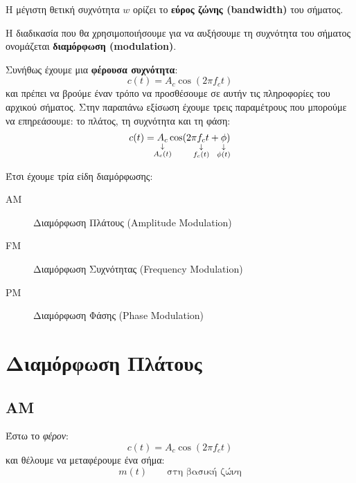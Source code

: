 \documentclass[11pt,a4paper,notitlepage,fleqn]{article}
\begin{document}

Η μέγιστη θετική συχνότητα \( w \) ορίζει το \textbf{εύρος ζώνης (bandwidth)} του σήματος.

Η διαδικασία που θα χρησιμοποιήσουμε για να αυξήσουμε τη συχνότητα του σήματος ονομάζεται
\textbf{διαμόρφωση (modulation)}.

Συνήθως έχουμε μια \textbf{φέρουσα συχνότητα}:
\[
c(t) = A_c\cos(2\pi f_c t)
\]
και πρέπει να βρούμε έναν τρόπο να προσθέσουμε σε αυτήν τις πληροφορίες του αρχικού σήματος.
Στην παραπάνω εξίσωση έχουμε τρεις παραμέτρους που μπορούμε να επηρεάσουμε: το πλάτος,
τη συχνότητα και τη φάση:
\[
c(t) =
\underset{\substack{\downarrow\\\mathclap{A_c(t)}}}{A_c}
\cos(2\pi
\underset{\substack{\downarrow\\\mathclap{f_c(t)}}}{f_c}
t
+
\underset{\substack{\downarrow\\\mathclap{\phi(t)}}}{\phi}
)
\]

Έτσι έχουμε τρία είδη διαμόρφωσης:
\begin{description}
	\item[AM] Διαμόρφωση Πλάτους (Amplitude Modulation)
	\item[FM] Διαμόρφωση Συχνότητας (Frequency Modulation)
	\item[PM] Διαμόρφωση Φάσης (Phase Modulation)
\end{description}

\section{Διαμόρφωση Πλάτους}

\subsection{AM}
Έστω το \emph{φέρον}:
\[
c(t) = A_c\cos(2\pi f_c t)
\]
και θέλουμε να μεταφέρουμε ένα σήμα:
\[
m(t) \qquad \text{στη βασική ζώνη}
\]
\end{document}
